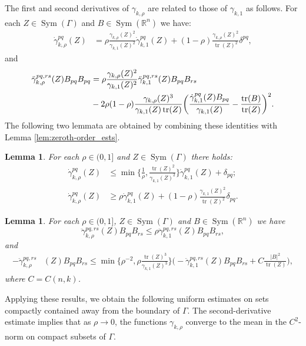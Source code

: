 \documentclass[12pt]{amsart}
\newtheorem{lemma}[theorem]{Lemma}
\DeclareMathOperator{\tr}{tr}
\DeclareMathOperator{\sym}{Sym}
\begin{document}
The first and second derivatives of $\gamma_{k,\rho}$ are related to those of $\gamma_{k,1}$ as follows. For each $Z \in \sym(\Gamma)$ and $B \in \sym(\mathbb{R}^n)$ we have:
\begin{align*}
\dot \gamma_{k,\rho}^{pq}(Z) &= \rho \frac{\gamma_{k,\rho}(Z)^2}{\gamma_{k,1}(Z)^2}  \dot \gamma_{k,1}^{pq}(Z)  + (1-\rho)\frac{\gamma_{k,\rho}(Z)^2}{\tr(Z)^2} \delta^{pq},
\end{align*}
and
\begin{align*}
\ddot \gamma_{k,\rho}^{pq, rs}(Z) B_{pq} B_{pq} &= \rho \frac{\gamma_{k,\rho}(Z)^2}{\gamma_{k,1}(Z)^2} \ddot \gamma_{k,1}^{pq,rs}(Z) B_{pq} B_{rs} \notag \\
&-2 \rho (1-\rho)\frac{\gamma_{k,\rho}(Z)^3}{\gamma_{k,1}(Z)  \tr(Z) } \bigg( \frac{\dot \gamma_{k,1}^{pq} (Z) B_{pq}}{\gamma_{k,1}(Z) } -\frac{\tr(B)}{\tr(Z) } \bigg)^2.
\end{align*}
The following two lemmata are obtained by combining these identities with Lemma \ref{lem:zeroth-order_ests}.
\begin{lemma}
\label{lem:first-order_ests}
For each $\rho \in (0, 1]$ and $Z \in \sym( \Gamma)$ there holds:
\begin{align*}
\dot \gamma_{k,\rho}^{pq}(Z) &\leq \min\bigg\{\frac{1}{\rho}, \frac{\tr(Z)^2}{\gamma_{k,1}(Z)^2} \bigg\}  \dot \gamma_{k,1}^{pq}(Z) +  \delta_{pq};\\
\dot \gamma_{k,\rho}^{pq}(Z)  &\geq \rho \dot \gamma_{k,1}^{pq}(Z) + (1-\rho)\frac{\gamma_{k,1}(Z)^2}{\tr(Z)^2} \delta_{pq}.
\end{align*}
\end{lemma}
\begin{lemma}
\label{lem:second-order_ests}
For each $\rho \in (0,1]$, $Z \in \sym(\Gamma)$ and $B \in \sym(\mathbb{R}^n)$ we have
\[\ddot \gamma_{k,\rho}^{pq,rs} (Z) B_{pq} B_{rs}\leq \rho \ddot \gamma_{k,1}^{pq,rs} (Z) B_{pq} B_{rs},\]
and
\begin{align*}
-\ddot \gamma_{k,\rho}^{pq,rs}&(Z) B_{pq} B_{rs} \leq \min\bigg\{\rho^{-2}, \rho \frac{\tr(Z)^3}{ \gamma_{k,1}(Z)^3}\bigg\} \bigg(-\ddot \gamma_{k,1}^{pq,rs}(Z)B_{pq} B_{rs} + C\frac{|B|^2}{\tr(Z)}\bigg),
\end{align*}
where $C = C(n,k)$.
\end{lemma}

Applying these results, we obtain the following uniform estimates on sets compactly contained away from the boundary of $\Gamma$. The second-derivative estimate implies that as $\rho \to 0$, the functions $\gamma_{k,\rho}$ converge to the mean in the $C^2$-norm on compact subsets of $\Gamma$.
\end{document}
